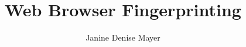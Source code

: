 \documentclass[bachelor,english]{hgbthesis}
\title{Web Browser Fingerprinting}
\author{Janine Denise Mayer}
\begin{document}
\frontmatter

\maketitle
\tableofcontents

%



\mainmatter          		








\appendix                              

\MakeBibliography                    				
\end{document}
